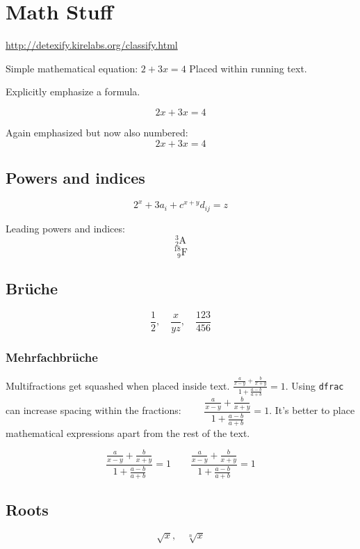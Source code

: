 \documentclass[10pt, a4paper]{article}
\numberwithin{equation}{section}
\numberwithin{figure}{section}
\begin{document}
\section{Math Stuff}

\url{http://detexify.kirelabs.org/classify.html}

Simple mathematical equation: \( 2 + 3x = 4\) Placed within running text.

Explicitly emphasize a formula.

\[ 2x + 3x = 4 \]

Again emphasized but now also numbered:
\begin{equation}
2x + 3x = 4
\end{equation}

\subsection{Powers and indices}

\[ 2^x + 3a_i + c^{x+y}d_{ij} = z  \]


Leading powers and indices:
\[ {}^3_2\mathrm{A} \]
\[ {}^{18}_{\phantom{1}9}\mathrm{F} \]


\subsection{Brüche}

\[\frac{1}{2}, \quad \frac{x}{yz},\quad \frac{123}{456}\]

\subsubsection{Mehrfachbrüche}

Multifractions get squashed when placed inside text. \( \frac{\frac{a}{x-y}+\frac{b}{x+y}}{1+\frac{a-b}{a+b}} = 1. \) Using \texttt{dfrac} can increase spacing within the fractions: \( \qquad \dfrac{\frac{a}{x-y}+\frac{b}{x+y}}{1+\frac{a-b}{a+b}} = 1 \). It's better to place mathematical expressions apart from the rest of the text.

\[\frac{\frac{a}{x-y}+\frac{b}{x+y}}{1+\frac{a-b}{a+b}} = 1 \qquad \dfrac{\frac{a}{x-y}+\frac{b}{x+y}}{1+\frac{a-b}{a+b}} = 1 \]

\subsection{Roots}

\[ \sqrt{x},\quad \sqrt[n]{x}  \]
\end{document}
